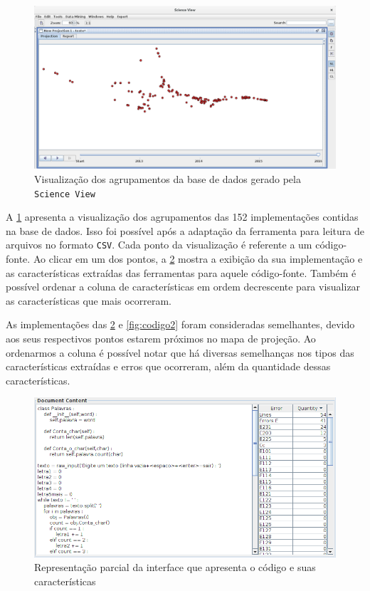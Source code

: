 		\begin{figure}[h]
			\centering
			\includegraphics[width=1\linewidth]{imagem/projecaoFinal} %
			\caption[Visualização dos agrupamentos da base de dados gerado pela \texttt{Science View}]
			{Visualização dos agrupamentos da base de dados gerado pela \texttt{Science View} \cite{Alencar-etal:2012}}
			\label{fig:projecaoFinal}
		\end{figure}
		
		A \cref{fig:projecaoFinal} apresenta a visualização dos agrupamentos das 152
		implementações contidas na base de dados. Isso foi possível após a adaptação da
		ferramenta para leitura de arquivos no formato \texttt{CSV}. Cada ponto da
		visualização é referente a um código-fonte. Ao clicar em um dos pontos, a
		\cref{fig:codigo1} mostra a exibição da sua implementação e
		as características extraídas das ferramentas para aquele código-fonte. Também
		é possível ordenar a coluna de características  em ordem
		decrescente para visualizar as características que mais ocorreram.
		
		As implementações das \cref{fig:codigo1} e \cref{fig:codigo2} foram consideradas
		semelhantes, devido aos seus respectivos pontos estarem próximos no mapa de
		projeção. Ao ordenarmos a coluna  é possível notar que há
		diversas semelhanças nos tipos das características extraídas e erros que
		ocorreram, além da quantidade dessas características.
		
		\begin{figure}[h]
			\centering
			\includegraphics[width=0.8\linewidth]{imagem/codigo1}
			\caption[Representação parcial da interface que apresenta o código e suas características]
			{Representação parcial da interface que apresenta o código e suas características \cite{Alencar-etal:2012}}
			\label{fig:codigo1}
		\end{figure}
		
